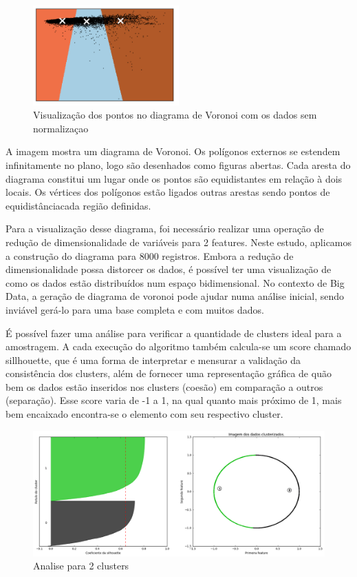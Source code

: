 \begin{figure}[!ht]
\caption{Visualização dos pontos no diagrama de Voronoi com os dados sem normaliza\c cao}
\centerline{\includegraphics[width=0.5\textwidth]{img/voronoi}}
\end{figure}

A imagem mostra um diagrama de Voronoi. Os polígonos externos se estendem infinitamente no plano, logo são desenhados como figuras abertas. Cada aresta do diagrama constitui um lugar onde os pontos são equidistantes em relação à dois locais. Os vértices dos polígonos estão ligados outras arestas sendo pontos de equidistânciacada região definidas.

Para a visualização desse diagrama, foi necessário realizar uma operação de redução de dimensionalidade de variáveis para 2 features. Neste estudo, aplicamos a construção do diagrama para 8000 registros. Embora a redução de dimensionalidade possa distorcer os dados, é possível ter uma visualização de como os dados estão distribuídos num espaço bidimensional. No contexto de Big Data, a geração de diagrama de voronoi pode ajudar numa análise inicial, sendo inviável gerá-lo para uma base completa e com muitos dados.


É possível fazer uma análise para verificar a quantidade de clusters ideal para a amostragem. A cada execução do algoritmo também calcula-se um score chamado sillhouette, que é uma forma de interpretar e mensurar a validação da consistência dos clusters, além de fornecer uma representação gráfica de quão bem os dados estão inseridos nos clusters (coesão) em comparação a outros (separação). Esse score varia de -1 a 1, na qual quanto mais próximo de 1, mais bem encaixado encontra-se o elemento com seu respectivo cluster.

\begin{figure}[ht]
\caption{Analise para 2 clusters }
\centerline{\includegraphics[width=.85\textwidth]{img/silhoute2}}
\end{figure}

